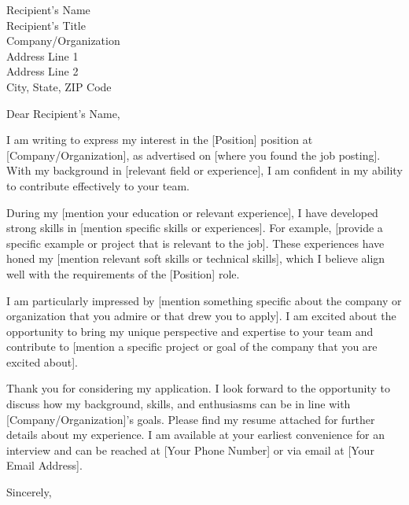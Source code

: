 \documentclass[a4paper,10pt]{letter}
\date{\today}
\begin{document}
\begin{letter}{
    Recipient's Name \\
    Recipient's Title \\
    Company/Organization \\
    Address Line 1 \\
    Address Line 2 \\
    City, State, ZIP Code
}

\opening{Dear Recipient's Name,}

I am writing to express my interest in the [Position] position at [Company/Organization], as advertised on [where you found the job posting]. With my background in [relevant field or experience], I am confident in my ability to contribute effectively to your team.

During my [mention your education or relevant experience], I have developed strong skills in [mention specific skills or experiences]. For example, [provide a specific example or project that is relevant to the job]. These experiences have honed my [mention relevant soft skills or technical skills], which I believe align well with the requirements of the [Position] role.

I am particularly impressed by [mention something specific about the company or organization that you admire or that drew you to apply]. I am excited about the opportunity to bring my unique perspective and expertise to your team and contribute to [mention a specific project or goal of the company that you are excited about].

Thank you for considering my application. I look forward to the opportunity to discuss how my background, skills, and enthusiasms can be in line with [Company/Organization]'s goals. Please find my resume attached for further details about my experience. I am available at your earliest convenience for an interview and can be reached at [Your Phone Number] or via email at [Your Email Address].

\closing{Sincerely,}


\end{letter}
\end{document}
